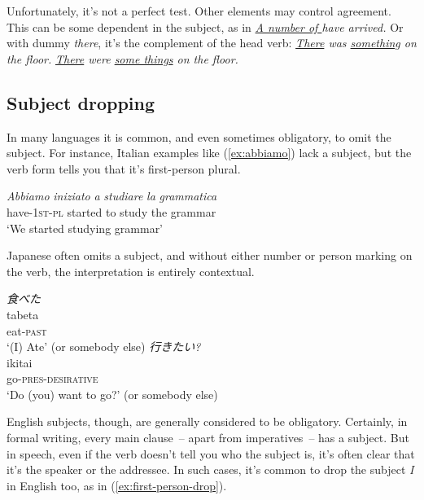 Unfortunately, it's not a perfect test. Other elements may control agreement. This can be some dependent in the subject, as in \textit{\uline{A number of } have arrived.} Or with dummy \textit{there}, it's the complement of the head verb: \textit{\uline{There} was \uline{something} on the floor.} \textit{\uline{There} were \uline{some things} on the floor.}

\subsection{Subject dropping}\label{sec:subject-dropping}
In many languages it is common, and even sometimes obligatory, to omit the subject. For instance, Italian examples like (\ref{ex:abbiamo}) lack a subject, but the verb form tells you that it's first-person plural.

\ea \label{ex:abbiamo}
    \gll \textit{Abbiamo} \textit{iniziato} \textit{a} \textit{studiare} \textit{la} \textit{grammatica} \\
    have-\textsc{1st-pl} started to study the grammar \\
        \glt `We started studying grammar'
\z
    
Japanese often omits a subject, and without either number or person marking on the verb, the interpretation is entirely contextual.

\ea
    \ea \label{ex:tabeta}
    \glll \textit{食べた} \\
    tabeta \\
    eat-\textsc{past} \\
    \glt `(I) Ate' (or somebody else)
    \ex \label{ex:ikitai}
    \glll \textit{行きたい?} \\
    ikitai \\
    go-\textsc{pres-desirative} \\
    \glt `Do (you) want to go?' (or somebody else)
    \z
\z

English subjects, though, are generally considered to be obligatory. Certainly, in formal writing, every main clause~-- apart from imperatives~-- has a subject. But in speech, even if the verb doesn't tell you who the subject is, it's often clear that it's the speaker or the addressee. In such cases, it's common to drop the subject \textit{I} in English too, as in (\ref{ex:first-person-drop}).

